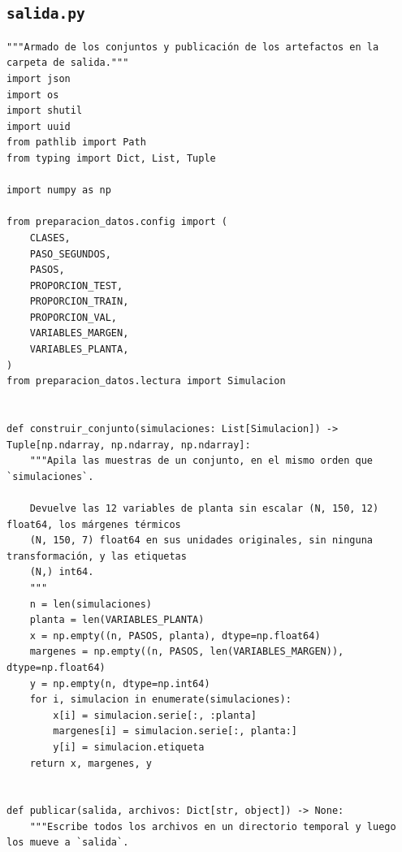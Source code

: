 \documentclass[12pt,a4paper]{article}
\begin{document}
\subsection*{\texttt{salida.py}}
\begin{lstlisting}
"""Armado de los conjuntos y publicación de los artefactos en la carpeta de salida."""
import json
import os
import shutil
import uuid
from pathlib import Path
from typing import Dict, List, Tuple

import numpy as np

from preparacion_datos.config import (
    CLASES,
    PASO_SEGUNDOS,
    PASOS,
    PROPORCION_TEST,
    PROPORCION_TRAIN,
    PROPORCION_VAL,
    VARIABLES_MARGEN,
    VARIABLES_PLANTA,
)
from preparacion_datos.lectura import Simulacion


def construir_conjunto(simulaciones: List[Simulacion]) -> Tuple[np.ndarray, np.ndarray, np.ndarray]:
    """Apila las muestras de un conjunto, en el mismo orden que `simulaciones`.

    Devuelve las 12 variables de planta sin escalar (N, 150, 12) float64, los márgenes térmicos
    (N, 150, 7) float64 en sus unidades originales, sin ninguna transformación, y las etiquetas
    (N,) int64.
    """
    n = len(simulaciones)
    planta = len(VARIABLES_PLANTA)
    x = np.empty((n, PASOS, planta), dtype=np.float64)
    margenes = np.empty((n, PASOS, len(VARIABLES_MARGEN)), dtype=np.float64)
    y = np.empty(n, dtype=np.int64)
    for i, simulacion in enumerate(simulaciones):
        x[i] = simulacion.serie[:, :planta]
        margenes[i] = simulacion.serie[:, planta:]
        y[i] = simulacion.etiqueta
    return x, margenes, y


def publicar(salida, archivos: Dict[str, object]) -> None:
    """Escribe todos los archivos en un directorio temporal y luego los mueve a `salida`.


\end{lstlisting}
\end{document}
